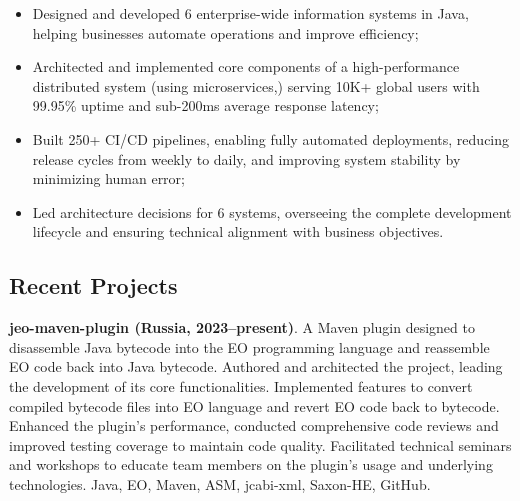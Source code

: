 \documentclass{vl}
\begin{document}

\begin{itemize}
    \itemsep0em
    \item Designed and developed 6 enterprise-wide information systems in Java, helping businesses automate operations and improve efficiency;
    \item Architected and implemented core components of a high-performance distributed system (using microservices,) serving 10K+ global users with 99.95\% uptime and sub-200ms average response latency;
    \item Built 250+ CI/CD pipelines, enabling fully automated deployments, reducing release cycles from weekly to daily, and improving system stability by minimizing human error;
    \item Led architecture decisions for 6 systems, overseeing the complete development lifecycle and ensuring technical alignment with business objectives.
\end{itemize}

\subsection*{Recent Projects}

\textbf{jeo-maven-plugin (Russia, 2023--present)}.
A Maven plugin designed to disassemble Java bytecode into the EO programming language and reassemble EO code back
into Java bytecode.
Authored and architected the project, leading the development of its core functionalities.
Implemented features to convert compiled bytecode files into EO language and revert EO code back to bytecode.
Enhanced the plugin's performance, conducted comprehensive code reviews and improved testing coverage to maintain
code quality.
Facilitated technical seminars and workshops to educate team members on the plugin's usage and underlying
technologies.
Java, EO, Maven, ASM, jcabi-xml, Saxon-HE, GitHub.
\end{document}
